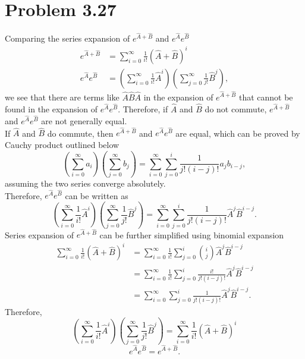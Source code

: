 \documentclass{article}
\begin{document}
\section*{Problem 3.27}
Comparing the series expansion of $e^{\hat{A}+\hat{B}}$ and $e^{\hat{A}} e^{\hat{B}}$
\begin{align*}
    e^{\hat{A}+\hat{B}}
    &=
    \sum_{i=0}^\infty \frac{1}{i!} (\hat{A}+\hat{B})^i \\
    e^{\hat{A}} e^{\hat{B}}
    &=
    (\sum_{i=0}^\infty \frac{1}{i!} \hat{A}^i)(\sum_{j=0}^\infty \frac{1}{j!} \hat{B}^j),
\end{align*}
we see that there are terms like $\hat{A}\hat{B}\hat{A}$ in the expansion of $e^{\hat{A}+\hat{B}}$ that cannot be found in the expansion of $e^{\hat{A}} e^{\hat{B}}$. Therefore, if $\hat{A}$ and $\hat{B}$ do not commute, $e^{\hat{A}+\hat{B}}$ and $e^{\hat{A}} e^{\hat{B}}$ are not generally equal. \\
If $\hat{A}$ and $\hat{B}$ do commute, then  $e^{\hat{A}+\hat{B}}$ and $e^{\hat{A}} e^{\hat{B}}$ are equal, which can be proved by Cauchy product outlined below
\[
    (\sum_{i=0}^\infty a_i)(\sum_{j=0}^\infty b_j)
    =\sum_{i=0}^{\infty}\sum_{j=0}^{i} \frac{1}{j!(i-j)!}a_jb_{i-j},
\]
assuming the two series converge absolutely.\\
Therefore, $e^{\hat{A}} e^{\hat{B}}$ can be written as
\[
    (\sum_{i=0}^\infty \frac{1}{i!} \hat{A}^i)(\sum_{j=0}^\infty \frac{1}{j!} \hat{B}^j)
    =
    \sum_{i=0}^{\infty}\sum_{j=0}^{i} \frac{1}{j!(i-j)!}\hat{A}^j\hat{B}^{i-j}.
\]
Series expansion of $e^{\hat{A}+\hat{B}}$ can be further simplified using binomial expansion
\[
    \begin{split}
        \sum_{i=0}^\infty \frac{1}{i!} (\hat{A}+\hat{B})^i 
        &=  \sum_{i=0}^\infty \frac{1}{i!}\sum_{j=0}^i \binom{i}{j} \hat{A}^j \hat{B}^{i-j} \\
        &=  \sum_{i=0}^\infty \frac{1}{i!}\sum_{j=0}^i \frac{i!}{j!(i-j)!} \hat{A}^j \hat{B}^{i-j} \\
        &= \sum_{i=0}^{\infty}\sum_{j=0}^{i} \frac{1}{j!(i-j)!}\hat{A}^j\hat{B}^{i-j}.
    \end{split}  
\]
Therefore,
\[
    (\sum_{i=0}^\infty \frac{1}{i!} \hat{A}^i)(\sum_{j=0}^\infty \frac{1}{j!} \hat{B}^j)
    = \sum_{i=0}^\infty \frac{1}{i!} (\hat{A}+\hat{B})^i
\]
\[
    e^{\hat{A}} e^{\hat{B}} = e^{\hat{A}+\hat{B}}.
\]
\end{document}
